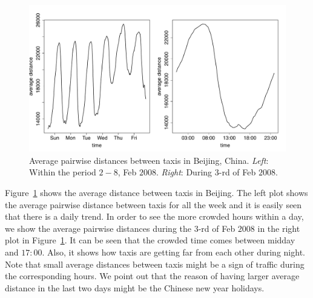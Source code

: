 \documentclass[article]{jss}
\begin{document}
\begin{figure}[!h]
\begin{center}
\includegraphics{article-016}
\end{center}
\caption{Average pairwise distances between taxis in Beijing, China. \emph{Left}: Within the period $2-8$, Feb $2008$. \emph{Right}: During $3$-rd of Feb $2008$.}
\label{distbijing}
\end{figure}

Figure~\ref{distbijing} shows the average distance between taxis in Beijing. The left plot shows the average pairwise distance between taxis for all the week and it is easily seen that there is a daily trend. In order to see the more crowded hours within a day, we show the average pairwise distances during the $3$-rd of Feb $2008$ in the right plot in Figure~\ref{distbijing}. It can be seen that the crowded time comes between midday and $17:00$. Also, it shows how taxis are getting far from each other during night. Note that small average distances between taxis might be a sign of traffic during the corresponding hours. We point out that the reason of having larger average distance in the last two days might be the Chinese new year holidays.
\end{document}

